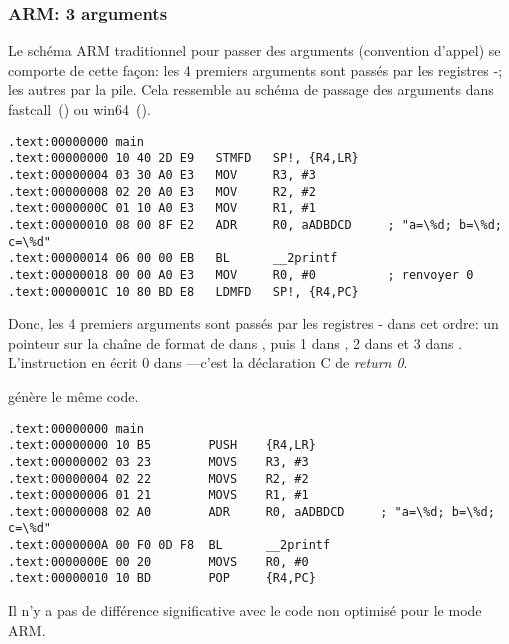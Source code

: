 \subsubsection{ARM: 3 arguments}

Le schéma ARM traditionnel pour passer des arguments (convention d'appel) se
comporte de cette façon:
les 4 premiers arguments sont passés par les registres -; les autres
par la pile.
Cela ressemble au schéma de passage des arguments dans
fastcall~() ou win64~().


\mysubparagraph{\NonOptimizingKeilVI (\ARMMode)}

\begin{lstlisting}[caption=\NonOptimizingKeilVI (\ARMMode),style=customasmARM]
.text:00000000 main
.text:00000000 10 40 2D E9   STMFD   SP!, {R4,LR}
.text:00000004 03 30 A0 E3   MOV     R3, #3
.text:00000008 02 20 A0 E3   MOV     R2, #2
.text:0000000C 01 10 A0 E3   MOV     R1, #1
.text:00000010 08 00 8F E2   ADR     R0, aADBDCD     ; "a=\%d; b=\%d; c=\%d"
.text:00000014 06 00 00 EB   BL      __2printf
.text:00000018 00 00 A0 E3   MOV     R0, #0          ; renvoyer 0
.text:0000001C 10 80 BD E8   LDMFD   SP!, {R4,PC}
\end{lstlisting}

Donc, les 4 premiers arguments sont passés par les registres - dans
cet ordre:
un pointeur sur la chaîne de format de \printf dans , puis 1 dans ,
2 dans  et 3 dans .
L'instruction en  écrit 0 dans ---c'est la déclaration C
de \emph{return 0}.

\OptimizingKeilVI génère le même code.

\mysubparagraph{\OptimizingKeilVI (\ThumbMode)}

\begin{lstlisting}[caption=\OptimizingKeilVI (\ThumbMode),style=customasmARM]
.text:00000000 main
.text:00000000 10 B5        PUSH    {R4,LR}
.text:00000002 03 23        MOVS    R3, #3
.text:00000004 02 22        MOVS    R2, #2
.text:00000006 01 21        MOVS    R1, #1
.text:00000008 02 A0        ADR     R0, aADBDCD     ; "a=\%d; b=\%d; c=\%d"
.text:0000000A 00 F0 0D F8  BL      __2printf
.text:0000000E 00 20        MOVS    R0, #0
.text:00000010 10 BD        POP     {R4,PC}
\end{lstlisting}

Il n'y a pas de différence significative avec le code non optimisé pour le mode ARM.

